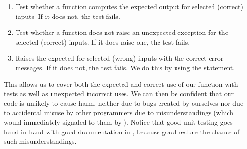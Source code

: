 %
\begin{enumerate}%
%
\item Test whether a function computes the expected output for selected (correct) inputs. %
If it does not, the test fails.%
%
\item Test whether a function does not raise an unexpected exception for the selected (correct) inputs. %
If it does raise one, the test fails.%
%
\item Raises the expected  for selected (wrong) inputs with the correct error messages. %
If it does not, the test fails. %
We do this by using the  statement.%
%
\end{enumerate}%
%
This allows us to cover both the expected and correct use of our function with tests as well as unexpected incorrect uses.
We can then be confident that our code is unlikely to cause harm, neither due to bugs created by ourselves nor due to accidental misuse by other programmers due to misunderstandings (which would immediately signaled to them by ).
Notice that good unit testing goes hand in hand with good documentation in , because good  reduce the chance of such misunderstandings.%
%
%
%
\FloatBarrier%
\endhsection%
%
%
%
